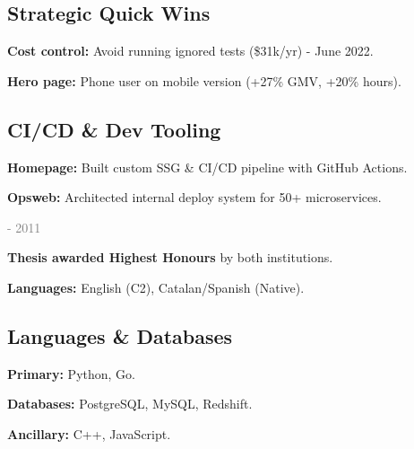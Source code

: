 \documentclass[a4paper]{MagicalCV}
\begin{document}
\begin{minipage}[t]{0.33\textwidth}
\subsection{Strategic Quick Wins}
\begin{tightemize}
\item {\bf Cost control: } Avoid running ignored tests (\$31k/yr) - June 2022.
\item {\bf Hero page: } Phone user on mobile version (+27\% GMV, +20\% hours).

\end{tightemize}
\sectionsep

\subsection{CI/CD \& Dev Tooling}
\begin{tightemize}
\item {\bf Homepage:} Built custom SSG \& CI/CD pipeline with GitHub Actions.
\item {\bf Opsweb:} Architected internal deploy system for 50+ microservices.


\end{tightemize}



\textcolor{gray}{\fontsize{10pt}{12pt} - 2011}
\hfill
{}


\begin{tightemize}
    \item {\bf Thesis awarded Highest Honours} by both institutions.
    \item {\bf Languages:} English (C2), Catalan/Spanish (Native).
\end{tightemize}



\sectionsep
\subsection{Languages \& Databases}
\begin{tightemize}
\item {\bf Primary:} Python, Go.
\item {\bf Databases:} PostgreSQL, MySQL, Redshift.
\item {\bf Ancillary:} C++, JavaScript.
\end{tightemize}
\sectionsep


\end{minipage}
\end{document}
